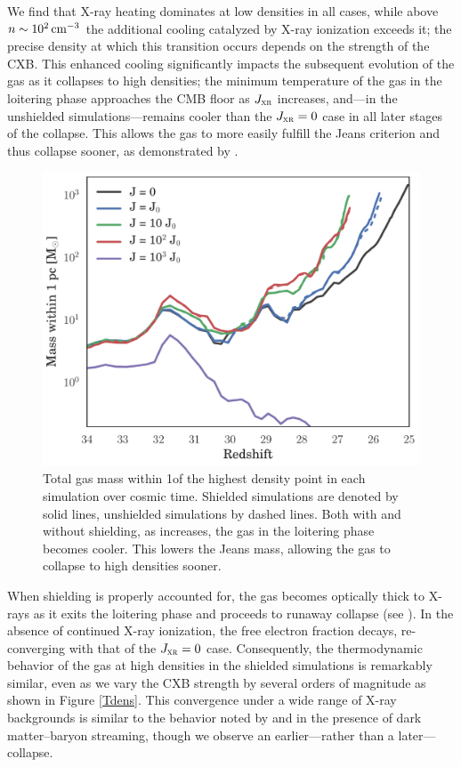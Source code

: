 \documentclass[../thesis.tex]{subfiles}
\begin{document}
We find that X-ray heating dominates at low densities in all cases, while above $n\sim10^2\,\mathrm{cm}^{-3}$ the additional cooling catalyzed by X-ray ionization exceeds it; the precise density at which this transition occurs depends on the strength of the CXB.  This enhanced cooling significantly impacts the subsequent evolution of the gas as it collapses to high densities; the minimum temperature of the gas in the loitering phase approaches the CMB floor as $J_{\textsc{xr}}$ increases, and---in the unshielded simulations---remains cooler than the $J_{\textsc{xr}}=0$ case in all later stages of the collapse. This allows the gas to more easily fulfill the Jeans criterion and thus collapse sooner, as demonstrated by .
\begin{figure}
  \begin{center}
    \includegraphics[width=\columnwidth]{figures/growth/collapse}
    \caption{Total gas mass within 1\pc of the highest density point in each simulation over cosmic time. Shielded simulations are denoted by solid lines, unshielded simulations by dashed lines.  Both with and without shielding, as \jxr increases, the gas in the loitering phase becomes cooler. This lowers the Jeans mass, allowing the gas to collapse to high densities sooner.}
    \label{xrfig:collapse}
  \end{center}
\end{figure}

When shielding is properly accounted for, the gas becomes optically thick to X-rays as it exits the loitering phase and proceeds to runaway collapse (see ).  In the absence of continued X-ray ionization, the free electron fraction decays, re-converging with that of the $J_{\textsc{xr}}=0$ case.  Consequently, the thermodynamic behavior of the gas at high densities in the shielded simulations is remarkably similar, even as we vary the CXB strength by several orders of magnitude as shown in Figure \ref{Tdens}. This convergence under a wide range of X-ray backgrounds is similar to the behavior noted by \citet{StacyBrommLoeb2011a} and \citet{Greifetal2011b} in the presence of dark matter--baryon streaming, though we observe an earlier---rather than a later---collapse.
\end{document}
